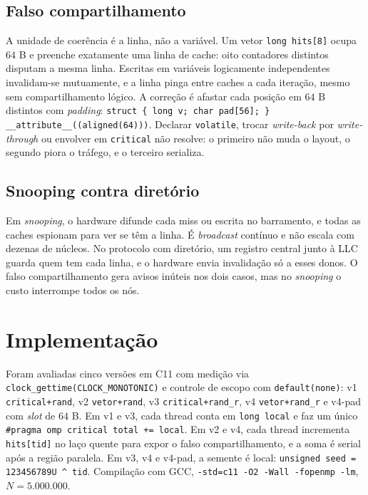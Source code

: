 \documentclass[11pt,letterpaper]{article}
\begin{document}
\subsection{Falso compartilhamento}

A unidade de coerência é a linha, não a variável. Um vetor \texttt{long hits[8]} ocupa $64$ B e preenche exatamente uma linha de cache: oito contadores distintos disputam a mesma linha. Escritas em variáveis logicamente independentes invalidam-se mutuamente, e a linha pinga entre caches a cada iteração, mesmo sem compartilhamento lógico. A correção é afastar cada posição em $64$ B distintos com \textit{padding}: \texttt{struct \{ long v; char pad[56]; \} \_\_attribute\_\_((aligned(64)))}. Declarar \texttt{volatile}, trocar \textit{write-back} por \textit{write-through} ou envolver em \texttt{critical} não resolve: o primeiro não muda o layout, o segundo piora o tráfego, e o terceiro serializa.

\subsection{Snooping contra diretório}

Em \textit{snooping}, o hardware difunde cada miss ou escrita no barramento, e todas as caches espionam para ver se têm a linha. É \textit{broadcast} contínuo e não escala com dezenas de núcleos. No protocolo com diretório, um registro central junto à LLC guarda quem tem cada linha, e o hardware envia invalidação só a esses donos. O falso compartilhamento gera avisos inúteis nos dois casos, mas no \textit{snooping} o custo interrompe todos os nós.

\section{Implementação}

Foram avaliadas cinco versões em C11 com medição via \texttt{clock\_gettime(CLOCK\_MONOTONIC)} e controle de escopo com \texttt{default(none)}: v1 \texttt{critical+rand}, v2 \texttt{vetor+rand}, v3 \texttt{critical+rand\_r}, v4 \texttt{vetor+rand\_r} e v4-pad com \textit{slot} de $64$ B. Em v1 e v3, cada thread conta em \texttt{long local} e faz um único \texttt{\#pragma omp critical total += local}. Em v2 e v4, cada thread incrementa \texttt{hits[tid]} no laço quente para expor o falso compartilhamento, e a soma é serial após a região paralela. Em v3, v4 e v4-pad, a semente é local: \texttt{unsigned seed = 123456789U \^{} tid}. Compilação com GCC, \texttt{-std=c11 -O2 -Wall -fopenmp -lm}, $N=5.000.000$.
\end{document}
